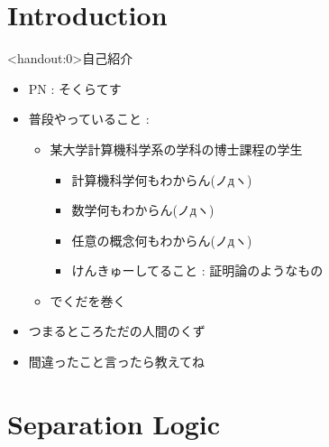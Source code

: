 \documentclass[notheorems, aspectratio=169, 12pt, unicode]{beamer}
\begin{document}
\begin{frame}
 \titlepage
\end{frame}

 \section{Introduction}
 
 \begin{frame}<handout:0>{自己紹介}
  \begin{itemize}
   \item PN : そくらてす
   \item 普段やっていること :
	 \begin{itemize}
	  \item 某大学計算機科学系の学科の博士課程の学生 \pause
		\begin{itemize}
		 \item \alert{計算機科学何もわからん(ノдヽ)} \pause
		 \item \alert{数学何もわからん(ノдヽ)} \pause
		 \item \alert{任意の概念何もわからん(ノдヽ)} \pause
		 \item けんきゅーしてること : 証明論のようなもの \pause
		\end{itemize}
	  \item {} でくだを巻く \pause 
	 \end{itemize}
   \item つまるところただの人間のくず \pause
   \item 間違ったこと言ったら教えてね
  \end{itemize}
 \end{frame}
 
 \section{Separation Logic}
\end{document}
